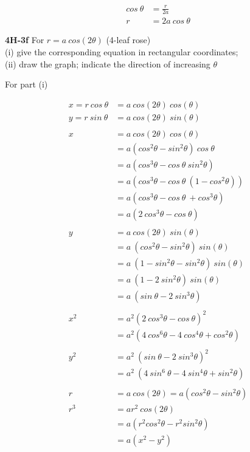 \documentclass[9pt]{article}
\begin{document}
\begin{align*}
  cos\ \theta &= \frac{r}{2a} \\
  r &= 2a\ cos\ \theta
\end{align*}


\begin{tcolorbox}
  \textbf{4H-3f} For $r = a\ cos(2\theta)$ (4-leaf rose) \\
  (i) give the corresponding equation in rectangular coordinates; \\
  (ii) draw the graph; indicate the direction of increasing $\theta$
\end{tcolorbox}

For part (i)

\begin{align*}
  x = r\ cos\ \theta &= a\ cos(2 \theta)\ cos(\theta) \\
  y = r\ sin\ \theta &= a\ cos(2 \theta)\ sin(\theta) \\
\\
  x &= a\ cos(2 \theta)\ cos(\theta) \\
    &= a(cos^2 \theta - sin^2 \theta)\ cos\ \theta \\
    &= a(cos^3 \theta - cos\ \theta\ sin^2 \theta) \\
    &= a(cos^3 \theta - cos\ \theta\ (1 - cos^2 \theta)) \\
    &= a(cos^3 \theta - cos\ \theta\ + cos^3 \theta) \\
    &= a(2\ cos^3 \theta - cos\ \theta) \\
\\
  y &= a\ cos(2 \theta)\ sin(\theta) \\
  &= a\ (cos^2 \theta - sin^2 \theta)\ sin(\theta) \\
  &= a\ (1 - sin^2 \theta - sin^2 \theta)\ sin(\theta) \\
  &= a\ (1 - 2\ sin^2 \theta)\ sin(\theta) \\
  &= a\ (sin\ \theta - 2\ sin^3 \theta) \\
\\
  x^2 &= a^2 (2\ cos^3 \theta - cos\ \theta)^2 \\
  &= a^2(4\ cos^6 \theta - 4\ cos^4 \theta + cos^2 \theta) \\
\\
  y^2 &= a^2\ (sin\ \theta - 2\ sin^3 \theta)^2 \\
  &= a^2\ (4\ sin^6\ \theta - 4\ sin^4 \theta + sin^2 \theta) \\
\\
  r &= a\ cos(2\theta) = a(cos^2 \theta - sin^2 \theta) \\
  r^3 &= ar^2\ cos(2\theta) \\
  &= a(r^2 cos^2 \theta - r^2 sin^2 \theta) \\
  &= a(x^2 - y^2)
\end{align*}
\end{document}
